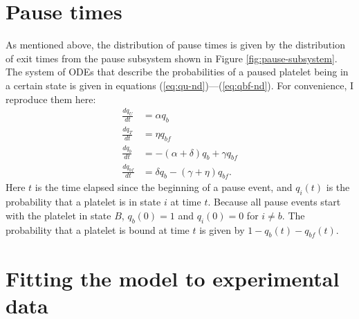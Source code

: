 \documentclass{article}
\newcommand{\dd}{d}
\newcommand{\Der}[2]{\frac{\dd #1}{\dd #2}}
\begin{document}
\section{Pause times}
\label{sec:pause-times}

As mentioned above, the distribution of pause times is given by the
distribution of exit times from the pause subsystem shown in Figure
\ref{fig:pause-subsystem}. The system of ODEs that describe the
probabilities of a paused platelet being in a certain state is given
in equations (\ref{eq:qu-nd})---(\ref{eq:qbf-nd}). For convenience, I
reproduce them here:
\begin{align*}
  \Der{q_U}{t} &= \alpha q_b \\
  \Der{q_T}{t} &= \eta q_{bf} \\
  \Der{q_b}{t} &= -(\alpha + \delta) q_b + \gamma q_{bf} \\
  \Der{q_{bf}}{t} &= \delta q_b - (\gamma + \eta) q_{bf}.
\end{align*}
Here $t$ is the time elapsed since the beginning of a pause event, and
$q_i(t)$ is the probability that a platelet is in state $i$ at time
$t$. Because all pause events start with the platelet in state $B$,
$q_b(0) = 1$ and $q_i(0) = 0$ for $i \neq b$. The probability that a
platelet is bound at time $t$ is given by $1 - q_b(t) - q_{bf}(t)$.

\newpage

\section{Fitting the model to experimental data}
\label{sec:fitt-model-exper}
\end{document}
